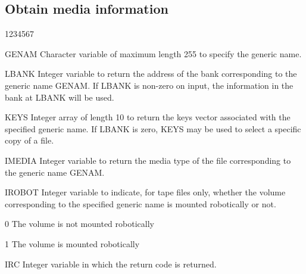 \subsection{Obtain media information}
\begin{DLtt}{1234567}
\item[GENAM]
Character variable of maximum length 255 to specify the generic name.
\item[LBANK]
Integer variable to return the address of the bank corresponding
to the generic name GENAM.
If LBANK is non-zero on input, the information in the 
bank at LBANK will be used.
\item[KEYS]
Integer array of length 10 to return the keys vector associated
with the specified generic name.
If LBANK is zero, KEYS may be used to select a specific
copy of a file.
\item[IMEDIA]
Integer variable to return the media type of the file
corresponding
to the generic name GENAM.
\item[IROBOT]
Integer variable to indicate, for tape files only,
whether the volume corresponding to the specified
generic name is mounted robotically or not.
\begin{DLtt}{12}
\item[0]The volume is not mounted robotically
\item[1]The volume is mounted robotically
\end{DLtt}
\item[IRC]
Integer variable in which the return code is returned.
\end{DLtt}
